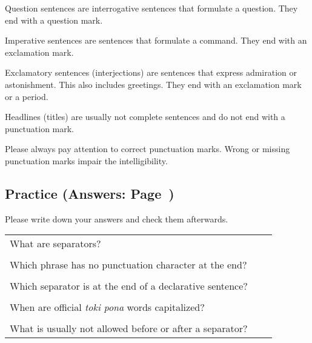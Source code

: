 Question sentences are interrogative sentences that formulate a question.
They end with a question mark.

Imperative sentences are sentences that formulate a command.
They end with an exclamation mark.

Exclamatory sentences (interjections) are sentences that express admiration or astonishment.
This also includes greetings.
They end with an exclamation mark or a period.

Headlines (titles) are usually not complete sentences and do not end with a punctuation mark.

Please always pay attention to correct punctuation marks.
Wrong or missing punctuation marks impair the intelligibility.

%
\newpage
\subsection*{Practice (Answers: Page~\pageref{'pronunciation_alphabet_answers'})}

Please write down your answers and check them afterwards.

\begin{supertabular}{p{5cm}|ll}
    What are separators?                                     &  & \\ %
                                                             &  & \\ %
    Which phrase has no punctuation character at the end?    &  & \\ %
                                                             &  & \\ %
    Which separator is at the end of a declarative sentence? &  & \\ %
                                                             &  & \\ %
    When are official \textit{toki pona} words capitalized?  &  & \\ %
                                                             &  & \\ %
    What is usually not allowed before or after a separator? &  & \\ %

\end{supertabular} \\%
%
